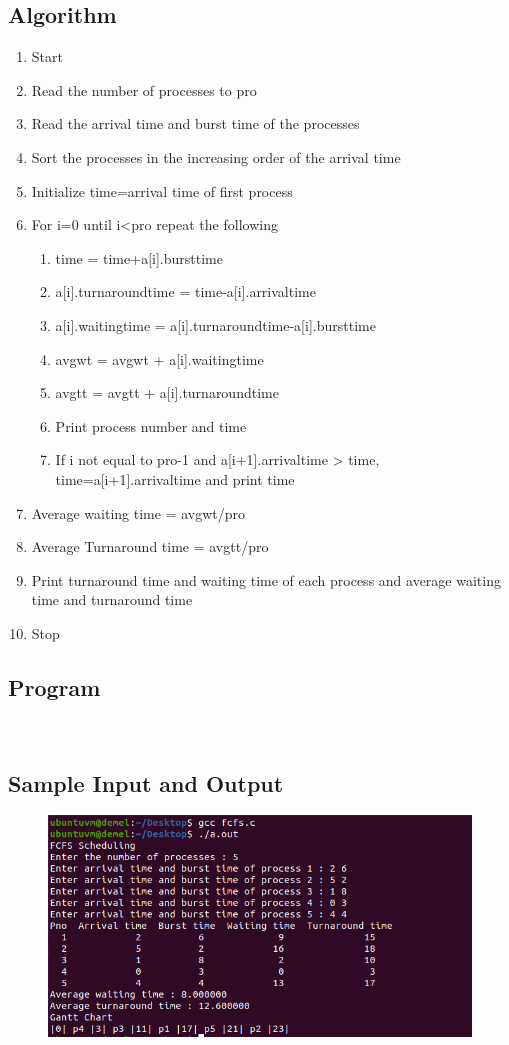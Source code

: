 \documentclass[a4paper]{article}
\begin{document}
\subsection{Algorithm}
\begin{enumerate}
\item Start
\item Read the number of processes to pro
\item Read the arrival time and burst time of the processes
\item Sort the processes in the increasing order of the arrival time
\item Initialize time=arrival time of first process
\item For i=0 until i<pro repeat the following
\begin{enumerate}
\item time = time+a[i].bursttime
\item a[i].turnaroundtime = time-a[i].arrivaltime
\item a[i].waitingtime = a[i].turnaroundtime-a[i].bursttime
\item avgwt = avgwt + a[i].waitingtime
\item avgtt = avgtt + a[i].turnaroundtime
\item Print process number and time
\item If i not equal to pro-1 and a[i+1].arrivaltime > time, time=a[i+1].arrivaltime and print time
\end{enumerate}
\item Average waiting time = avgwt/pro
\item Average Turnaround time = avgtt/pro
\item Print turnaround time and waiting time of each process and average waiting time and turnaround time
\item Stop
\end{enumerate}
\subsection{Program}

\\
\newpage
\subsection{Sample Input and Output}
\begin{figure}[!h]
	\centering
	\includegraphics[width=\textwidth]{fcfs.png}
\end{figure}
\end{document}
